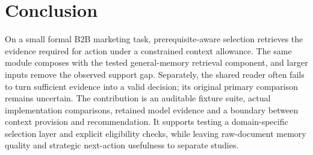 \section{Conclusion}
On a small formal B2B marketing task, prerequisite-aware selection retrieves the evidence required for action under a constrained context allowance. The same module composes with the tested general-memory retrieval component, and larger inputs remove the observed support gap. Separately, the shared reader often fails to turn sufficient evidence into a valid decision; its original primary comparison remains uncertain. The contribution is an auditable fixture suite, actual implementation comparisons, retained model evidence and a boundary between context provision and recommendation. It supports testing a domain-specific selection layer and explicit eligibility checks, while leaving raw-document memory quality and strategic next-action usefulness to separate studies.
